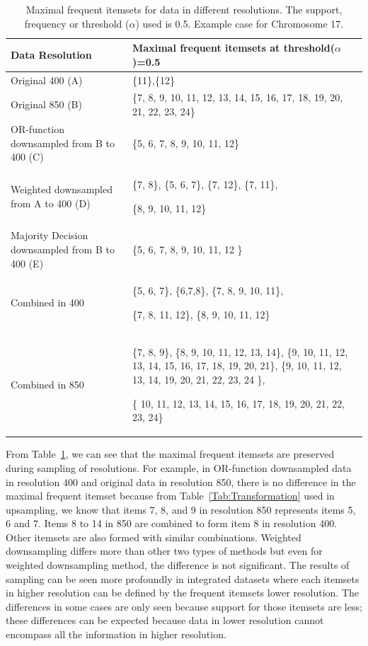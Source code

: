 \begin{table}[h!]
  \centering
  \begin{tabular}{|p{}|p{}|}
    \hline
    \textbf{Data Resolution} 	&	\textbf{Maximal frequent itemsets at threshold($\alpha$)=0.5 }\\ \hline
    Original 400 (A)		&	\{11\},\{12\}	  \\ \hline
    Original 850 (B)		&	\{7, 8, 9, 10, 11, 12, 13, 14, 15, 16, 17, 18, 19, 20, 21, 22, 23, 24\}      \\ \hline
    OR-function downsampled from B to 400 (C)		&	\{5, 6, 7, 8, 9, 10, 11, 12\}      \\ \hline
    Weighted downsampled from A to 400 (D)		&	\{7, 8\}, \{5, 6, 7\}, \{7, 12\}, \{7, 11\},  
    
    \{8, 9, 10, 11, 12\}	  \\ \hline
    Majority Decision downsampled from B to 400 (E)	&	\{5, 6, 7, 8, 9, 10, 11, 12 \}  \\ \hline
    Combined in  400 					&	\{5, 6, 7\}, \{6,7,8\}, \{7, 8, 9, 10, 11\}, 
    
    \{7, 8, 11, 12\}, \{8, 9, 10, 11, 12\}    \\ \hline
    Combined in  850 					&	\{7, 8, 9\},  \{8, 9, 10, 11, 12, 13, 14\}, \{9, 10, 11, 12, 13, 14, 15, 16, 17, 18, 19, 20, 21\}, \{9, 10, 11, 12, 13, 14, 19, 20, 21, 22, 23, 24 \}, 
    
    \{ 10, 11, 12, 13, 14, 15, 16, 17, 18, 19, 20, 21, 22, 23, 24\}      \\ \hline     
  \end{tabular}
  \caption[MFI for data in different resolutions]{Maximal frequent itemsets for data in different resolutions. The support, frequency or threshold ($\alpha$) used is 0.5. Example case for Chromosome 17.} \label{Tab:maximal}
\end{table}

From Table~\ref{Tab:maximal}, we can see that the maximal frequent itemsets are preserved during sampling of resolutions. For example, in OR-function downsampled data in resolution 400 and original data in resolution 850, there is no difference in the maximal frequent itemset because from Table~\ref{Tab:Transformation} used in upsampling,  we know that items 7, 8, and 9 in resolution 850 represents items 5, 6 and 7. Items 8 to 14 in 850 are combined to form item 8 in resolution 400. Other itemsets are also formed with similar combinations. Weighted downsampling differs more than other two types of methods but even for weighted downsampling method, the difference is not significant. The results of sampling can be seen more profoundly in integrated datasets where each itemsets in higher resolution can be defined by the frequent itemsets lower resolution. The differences in some cases are only seen because support for those itemsets are less; these differences can be expected because data in lower resolution cannot encompass all the information in higher resolution.

